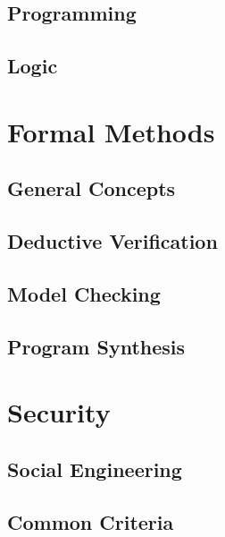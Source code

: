 \documentclass{book}
\begin{document}
  \chapter{Programming}\label{sec:sd:program}
  

  \chapter{Logic}\label{sec:sd:logic}
  
  
\part{Formal Methods}\label{sec:sd:fm}

  \chapter{General Concepts}\label{sec:sd:fmoverview}
    

  \chapter{Deductive Verification}\label{sec:sd:deductive}
    

  \chapter{Model Checking}\label{sec:sd:modelcheck}
    

  \chapter{Program Synthesis}\label{sec:sd:synthesis}
    

\part{Security}

  \chapter{Social Engineering}

  \chapter{Common Criteria}
\end{document}
